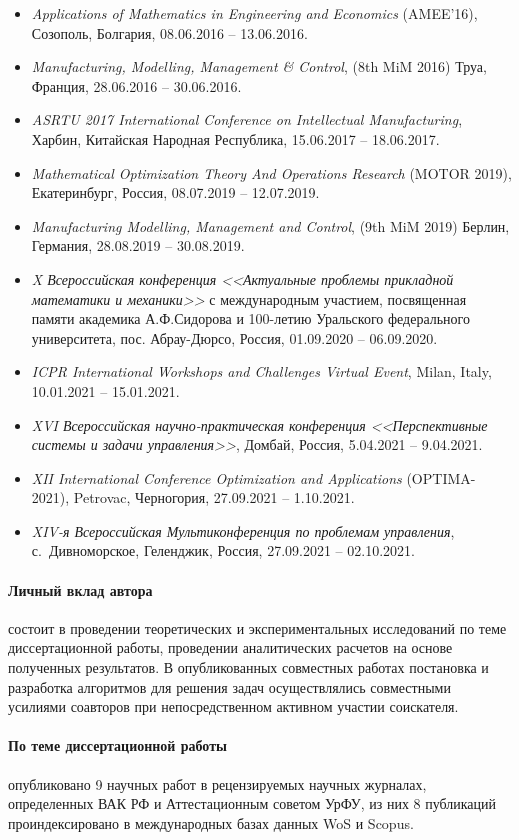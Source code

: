 \begin{itemize}
    \item
    \textit{Applications of Mathematics in Engineering and Economics}
    (AMEE'16),
    Созополь, Болгария,
    08.06.2016 -- 13.06.2016.
    \item
    \textit{Manufacturing, Modelling, Management \& Control},
    (8th MiM 2016)
    Труа, Франция,
    28.06.2016 -- 30.06.2016.
    \item
    \textit{ASRTU 2017 International Conference on Intellectual Manufacturing},
    Харбин, Китайская Народная Республика,
    15.06.2017 -- 18.06.2017.
    \item
    \textit{Mathematical Optimization Theory And Operations Research}
    (MOTOR 2019),
    Екатеринбург, Россия,
    08.07.2019 -- 12.07.2019.
    \item
    \textit{Manufacturing Modelling, Management and Control},
    (9th MiM 2019)
    Берлин, Германия,
    28.08.2019 -- 30.08.2019.
    \item
    \textit{X Всероссийская конференция
    <<Актуальные проблемы прикладной математики и механики>>}
    с международным участием,
    посвященная памяти академика А.Ф.Сидорова и 100-летию Уральского федерального университета,
    пос. Абрау-Дюрсо, Россия,
    01.09.2020 -- 06.09.2020.
    \item
    \textit{ICPR International Workshops and Challenges Virtual Event},
    Milan, Italy,
    10.01.2021 -- 15.01.2021.
    \item
    \textit{XVI Всероссийская научно-практическая конференция
    <<Перспективные системы и задачи управления>>},
    Домбай, Россия,
    5.04.2021 -- 9.04.2021.
    \item
    \textit{XII International Conference Optimization and Applications}
    (OPTIMA-2021),
    Petrovac, Черногория,
    27.09.2021 -- 1.10.2021.
    \item
    \textit{XIV-я Всероссийская Мультиконференция по проблемам управления},
    с.~Дивноморское, Геленджик, Россия,
    27.09.2021 -- 02.10.2021.
\end{itemize}

\paragraph*{Личный вклад автора}
состоит в проведении теоретических и экспериментальных исследований
по теме диссертационной работы,
проведении аналитических расчетов на основе полученных результатов.
В опубликованных совместных работах постановка и разработка алгоритмов для
решения задач осуществлялись совместными усилиями соавторов
при непосредственном активном участии соискателя.

\paragraph*{По теме диссертационной работы}
опубликовано
9 научных работ
в рецензируемых научных журналах,
определенных ВАК РФ и
Аттестационным советом УрФУ,
из них
8 публикаций проиндексировано в международных базах данных
WoS и Scopus.
